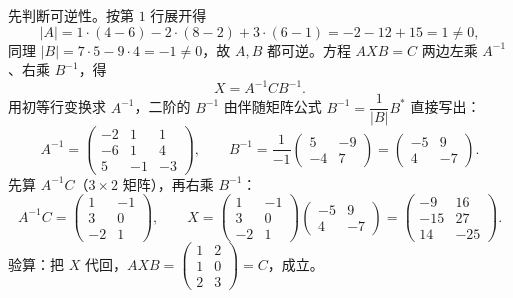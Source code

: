 \begin{solution}
先判断可逆性。按第 $1$ 行展开得
\[
|A|=1\cdot(4-6)-2\cdot(8-2)+3\cdot(6-1)=-2-12+15=1\ne0 ,
\]
同理 $|B|=7\cdot5-9\cdot4=-1\ne0$，故 $A,B$ 都可逆。方程 $AXB=C$ 两边左乘 $A^{-1}$、右乘 $B^{-1}$，得
\[
X=A^{-1}CB^{-1}.
\]
用初等行变换求 $A^{-1}$，二阶的 $B^{-1}$ 由伴随矩阵公式 $B^{-1}=\dfrac{1}{|B|}B^{*}$ 直接写出：
\[
A^{-1}=\begin{pmatrix}-2&1&1\\-6&1&4\\5&-1&-3\end{pmatrix},
\qquad
B^{-1}=\frac{1}{-1}\begin{pmatrix}5&-9\\-4&7\end{pmatrix}
=\begin{pmatrix}-5&9\\4&-7\end{pmatrix}.
\]
先算 $A^{-1}C$（$3\times2$ 矩阵），再右乘 $B^{-1}$：
\[
A^{-1}C=\begin{pmatrix}1&-1\\3&0\\-2&1\end{pmatrix},
\qquad
X=\begin{pmatrix}1&-1\\3&0\\-2&1\end{pmatrix}
\begin{pmatrix}-5&9\\4&-7\end{pmatrix}
=\begin{pmatrix}-9&16\\-15&27\\14&-25\end{pmatrix}.
\]
验算：把 $X$ 代回，$AXB=\begin{pmatrix}1&2\\1&0\\2&3\end{pmatrix}=C$，成立。
\end{solution}

